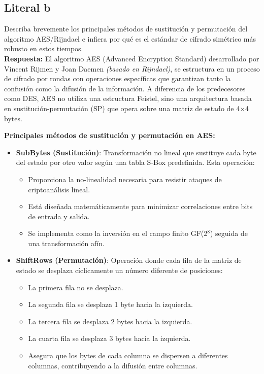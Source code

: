 {\subsection{Literal b}
Describa brevemente los principales métodos de sustitución y permutación del algoritmo AES/Rijndael e infiera por qué es el estándar de cifrado simétrico más robusto en estos tiempos.
\\
\textbf{Respuesta:}
El algoritmo AES (Advanced Encryption Standard) desarrollado por Vincent Rijmen y Joan Daemen \textit{(basado en Rijndael)}, se estructura en un proceso de cifrado por rondas con operaciones específicas que garantizan tanto la confusión como la difusión de la información. A diferencia de los predecesores como DES, AES no utiliza una estructura Feistel, sino una arquitectura basada en sustitución-permutación (SP) que opera sobre una matriz de estado de 4×4 bytes.

\textbf{Principales métodos de sustitución y permutación en AES:}

\begin{itemize}
    \item \textbf{SubBytes (Sustitución)}: Transformación no lineal que sustituye cada byte del estado por otro valor según una tabla S-Box predefinida. Esta operación:
    \begin{itemize}
        \item Proporciona la no-linealidad necesaria para resistir ataques de criptoanálisis lineal.
        \item Está diseñada matemáticamente para minimizar correlaciones entre bits de entrada y salida.
        \item Se implementa como la inversión en el campo finito GF(2$^8$) seguida de una transformación afín.
    \end{itemize}
    
    \item \textbf{ShiftRows (Permutación)}: Operación donde cada fila de la matriz de estado se desplaza cíclicamente un número diferente de posiciones:
    \begin{itemize}
        \item La primera fila no se desplaza.
        \item La segunda fila se desplaza 1 byte hacia la izquierda.
        \item La tercera fila se desplaza 2 bytes hacia la izquierda.
        \item La cuarta fila se desplaza 3 bytes hacia la izquierda.
        \item Asegura que los bytes de cada columna se dispersen a diferentes columnas, contribuyendo a la difusión entre columnas.
    \end{itemize}
    

\end{itemize}}
